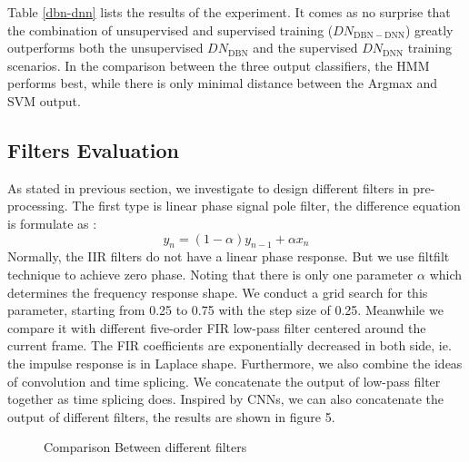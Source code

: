 \documentclass{article}
\begin{document}
Table \ref{dbn-dnn} lists the results of the experiment. It comes as no surprise that the combination of unsupervised and supervised training ($DN_\mathrm{DBN-DNN}$) greatly outperforms both the unsupervised $DN_\mathrm{DBN}$ and the supervised $DN_\mathrm{DNN}$ training scenarios. In the comparison between the three output classifiers, the HMM performs best, while there is only minimal distance between the Argmax and SVM output.

\subsection{Filters Evaluation}
As stated in previous section, we investigate to design different filters in pre-processing. The first type is linear phase signal pole filter, the difference equation is formulate as :
\begin{equation}\label{IIR}
y_{n} = (1-\alpha) y_{n-1} + \alpha x_{n}
\end{equation}
Normally, the IIR filters do not have a linear phase response. But we use filtfilt technique to achieve zero phase. Noting that there is only one parameter $\alpha$ which determines the frequency response shape. We conduct a grid search for this parameter, starting from 0.25 to 0.75 with the step size of 0.25. Meanwhile we compare it with different five-order FIR low-pass filter centered around the current frame. The FIR coefficients are exponentially decreased in both side, ie. the impulse response is in Laplace shape. Furthermore, we also combine the ideas of convolution and time splicing. We concatenate the output of low-pass filter together as time splicing does. Inspired by CNNs, we can also concatenate the output of different filters, the results are shown in figure 5.

\begin{figure}
 \centerline{}
 \caption{Comparison Between different filters}
\end{figure}
\end{document}
